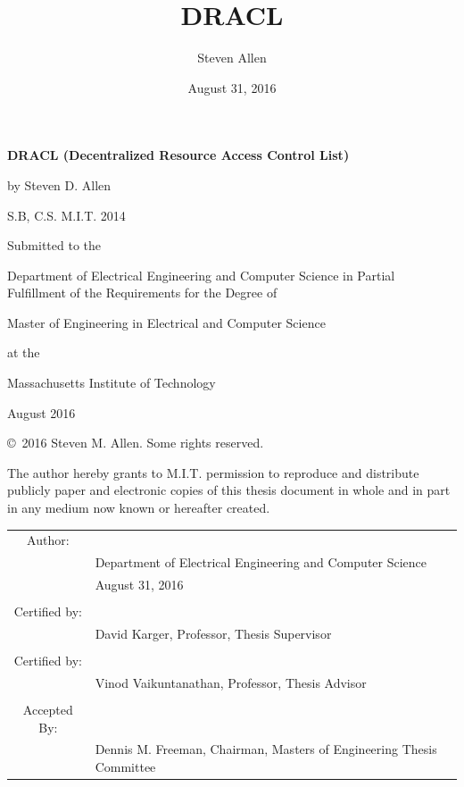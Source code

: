 \documentclass[pdftex,12pt,a4papaer,twoside,notitlepage]{report}
\title{DRACL}
\author{Steven Allen}
\date{August 31, 2016}
\begin{document}

\begin{titlingpage}

  \begin{singlespacing}

    \setlength{\parskip}{1em}
    \begin{center}

      \textbf{DRACL (Decentralized Resource Access Control List)}

      by Steven D. Allen

      S.B, C.S. M.I.T. 2014

      \vspace{2em}

      Submitted to the

      Department of Electrical Engineering and Computer Science in
      Partial Fulfillment of the Requirements for the Degree of

      Master of Engineering in Electrical and Computer Science

      at the

      Massachusetts Institute of Technology

      August 2016

      \copyright~2016 Steven M. Allen. Some rights reserved.

      The author hereby grants to M.I.T. permission to reproduce and distribute
      publicly paper and electronic copies of this thesis document in whole and in
      part in any medium now known or hereafter created.

      \vspace{3em}
      \begin{tabular}{c l}
        Author: & \hrulefill \\
                & {\small Department of Electrical Engineering and Computer Science } \\
                & {\small August 31, 2016 } \\
        \\
        Certified by: & \hrulefill \\
                & {\small David Karger, Professor, Thesis Supervisor } \\
        \\
        Certified by: & \hrulefill \\
                & {\small Vinod Vaikuntanathan, Professor, Thesis Advisor } \\
        \\
        Accepted By: & \hrulefill \\
                & {\small Dennis M. Freeman, Chairman, Masters of Engineering Thesis Committee } \\
      \end{tabular}
    \end{center}

  \end{singlespacing}

\end{titlingpage}
\end{document}
